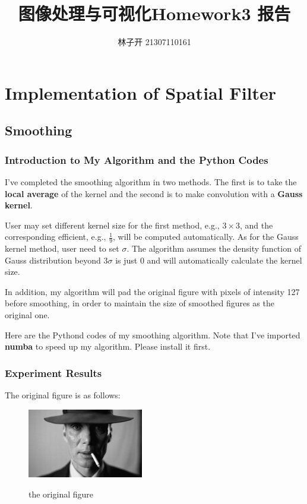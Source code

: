 \documentclass{article}
\title{图像处理与可视化Homework3 报告}
\author{林子开 21307110161}
\begin{document}
	\maketitle
	\tableofcontents

\section{Implementation of Spatial Filter}
\subsection{Smoothing}
\subsubsection{Introduction to My Algorithm and the Python Codes}
I've completed the smoothing algorithm in two methods. The first is to
take the \textbf{local average} of the kernel and the second is 
to make convolution with a \textbf{Gauss kernel}. 

User may set different kernel size for the first method, e.g., $3\times 3$,
and the corresponding efficient, e.g., $\frac{1}{9}$, will be computed automatically.
As for the Gauss kernel method, user need to set $\sigma$. The algorithm assumes the 
density function of Gauss distribution beyond $3\sigma$ is just 0 and will automatically
calculate the kernel size.

In addition, my algorithm will pad the original figure with pixels of intensity 127 before
smoothing, in order to maintain the size of smoothed figures as the original one. 

Here are the Pythond codes of my smoothing algorithm. Note that I've imported
\textbf{numba} to speed up my algorithm. Please install it first.



\subsubsection{Experiment Results}
The original figure is as follows:
\begin{figure}[H]
	\centering
	{\includegraphics[width=0.45\textwidth]{test.jpeg}} 
	\caption{the original figure} \label{testFig}
\end{figure}
\end{document}
